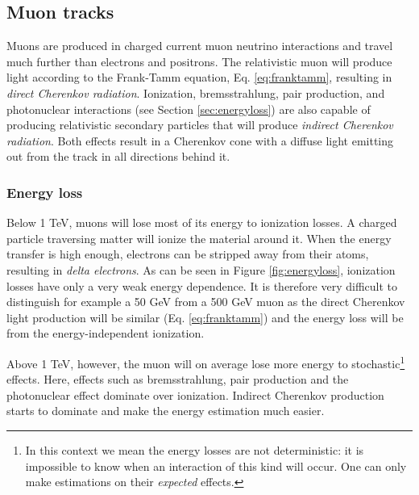 \subsection{Muon tracks}
Muons are produced in charged current muon neutrino interactions and travel much further than electrons and positrons. The relativistic muon will produce light according to the Frank-Tamm equation, Eq. \ref{eq:franktamm}, resulting in \textit{direct Cherenkov radiation}. Ionization, bremsstrahlung, pair production, and photonuclear interactions (see Section \ref{sec:energyloss}) are also capable of producing relativistic secondary particles that will produce \textit{indirect Cherenkov radiation}. Both effects result in a Cherenkov cone with a diffuse light emitting out from the track in all directions behind it. 

\subsubsection{Energy loss}
\label{subsub:energyloss}
Below 1 TeV, muons will lose most of its energy to ionization losses. A charged particle traversing matter will ionize the material around it. When the energy transfer is high enough, electrons can be stripped away from their atoms, resulting in \textit{delta electrons}. As can be seen in Figure \ref{fig:energyloss}, ionization losses have only a very weak energy dependence. It is therefore very difficult to distinguish for example a 50 GeV from a 500 GeV muon as the direct Cherenkov light production will be similar (Eq. \ref{eq:franktamm}) and the energy loss will be from the energy-independent ionization.

Above 1 TeV, however, the muon will on average lose more energy to stochastic\footnote{In this context we mean the energy losses are not deterministic: it is impossible to know when an interaction of this kind will occur. One can only make estimations on their \textit{expected} effects.} effects. Here, effects such as bremsstrahlung, pair production and the photonuclear effect dominate over ionization. Indirect Cherenkov production starts to dominate and make the energy estimation much easier.\\

